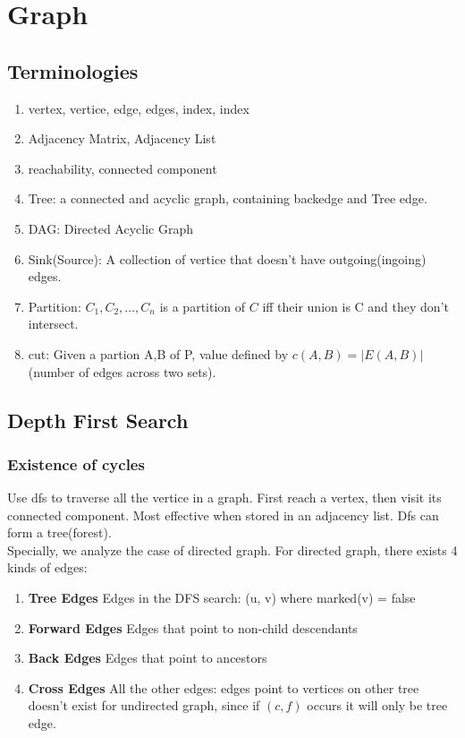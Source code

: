 \section{Graph}
\subsection*{Terminologies}
\begin{enumerate}
    \item vertex, vertice, edge, edges, index, index
    \item Adjacency Matrix, Adjacency List
    \item reachability, connected component
    \item Tree: a connected and acyclic graph, containing backedge and Tree edge.
    \item DAG: Directed Acyclic Graph
    \item Sink(Source): A collection of vertice that doesn't have outgoing(ingoing) edges.
    \item Partition: $C_1,C_2,\ldots ,C_n$ is a partition of $C$ iff their union is C and they don't intersect.
    \item cut: Given a partion {A,B} of P, value defined by $c(A,B)=|E(A,B)|$(number of edges across two sets).
\end{enumerate}

\subsection{Depth First Search}
\subsubsection{Existence of cycles}
Use dfs to traverse all the vertice in a graph. First reach a vertex, then visit its connected component. Most effective when stored in an adjacency list.
Dfs can form a tree(forest).\\
Specially, we analyze the case of directed graph.
For directed graph, there exists 4 kinds of edges: 
\begin{enumerate}
    \item \textbf{Tree Edges} Edges in the DFS search: (u, v) where marked(v) = false
    \item \textbf{Forward Edges} Edges that point to non-child descendants
    \item \textbf{Back Edges} Edges that point to ancestors
    \item \textbf{Cross Edges} All the other edges: edges point to vertices on other tree
    doesn't exist for undirected graph, since if $(c,f)$ occurs it will only be tree edge.
\end{enumerate}

